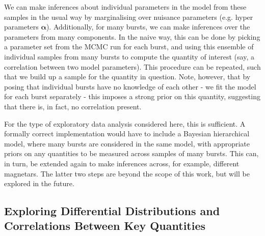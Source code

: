 \documentclass[12pt]{emulateapj}
\begin{document}
We can make inferences about individual parameters in the model from these samples in the usual way by marginalising over nuisance parameters (e.g. 
hyper parameters $\bm{\alpha}$). Additionally, for many bursts, we can make inferences over the parameters from many components. In the naive way,
this can be done by picking a parameter set from the MCMC run for each burst, and using this ensemble of individual samples from many bursts 
to compute the quantity of interest (say, a correlation between two model parameters). This procedure can be repeated, such that we build up a sample
for the quantity in question. Note, however, that by posing that individual bursts have no knowledge of each other - we fit the model for each burst separately - 
this imposes a strong prior on this quantity, suggesting that there is, in fact, no correlation present. 


For the type of exploratory data analysis considered here, this is sufficient. A formally correct implementation would have to include a Bayesian hierarchical model,
where many bursts are considered in the same model, with appropriate priors on any quantities to be measured across samples of many bursts. This can, in turn,
be extended again to make inferences across, for example, different magnetars. The latter two steps are beyond the scope of this work, but will be explored in the future.




\subsection{Exploring Differential Distributions and Correlations Between Key Quantities}
\label{sec:exploration}
\end{document}
